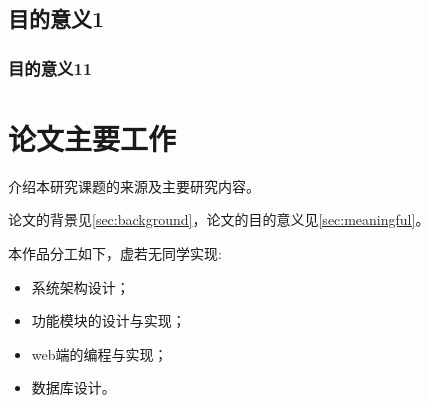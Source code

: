 \subsection{目的意义1}
\subsubsection{目的意义11}


\section{论文主要工作}
介绍本研究课题的来源及主要研究内容。

论文的背景见\ref{sec:background}，论文的目的意义见\ref{sec:meaningful}。

本作品分工如下，虚若无同学实现:
\begin{itemize}
	\item 系统架构设计；
	\item 功能模块的设计与实现；
	\item web端的编程与实现；
	\item 数据库设计。
\end{itemize}
